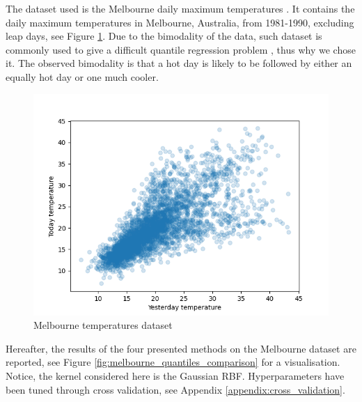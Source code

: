 The dataset used is the Melbourne daily maximum temperatures . It contains the daily maximum temperatures in Melbourne, Australia, from 1981-1990, excluding leap days, see Figure \ref{fig:melbourne_temperature_data}.
Due to the bimodality of the data, such dataset is commonly used to give a difficult quantile regression problem \cite{hyndman1996estimating}, thus why we chose it. The observed bimodality is that a hot day is likely to be followed by either an equally hot day or one much cooler.
\begin{figure}[!htp]
    \includegraphics[width=\textwidth]{images/melbourne_temperature.png}
    \caption{Melbourne temperatures dataset}
    \label{fig:melbourne_temperature_data}
\end{figure}
Hereafter, the results of the four presented methods on the Melbourne dataset are reported, see Figure \ref{fig:melbourne_quantiles_comparison} for a visualisation. Notice, the kernel considered here is the Gaussian RBF. Hyperparameters have been tuned through cross validation, see Appendix \ref{appendix:cross_validation}.
